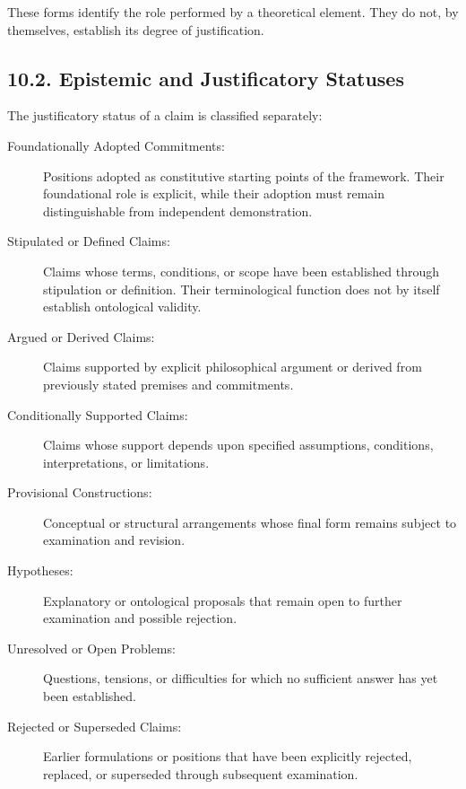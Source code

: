 These forms identify the role performed
by a theoretical element. They do not,
by themselves, establish its degree
of justification.

\subsection*{10.2. Epistemic and Justificatory Statuses}

The justificatory status of a claim
is classified separately:

\begin{description}

    \item[Foundationally Adopted Commitments:]
    Positions adopted as constitutive
    starting points of the framework.
    Their foundational role is explicit,
    while their adoption must remain
    distinguishable from independent
    demonstration.

    \item[Stipulated or Defined Claims:]
    Claims whose terms, conditions,
    or scope have been established
    through stipulation or definition.
    Their terminological function does
    not by itself establish ontological
    validity.

    \item[Argued or Derived Claims:]
    Claims supported by explicit
    philosophical argument or derived
    from previously stated premises
    and commitments.

    \item[Conditionally Supported Claims:]
    Claims whose support depends upon
    specified assumptions, conditions,
    interpretations, or limitations.

    \item[Provisional Constructions:]
    Conceptual or structural arrangements
    whose final form remains subject
    to examination and revision.

    \item[Hypotheses:]
    Explanatory or ontological proposals
    that remain open to further
    examination and possible rejection.

    \item[Unresolved or Open Problems:]
    Questions, tensions, or difficulties
    for which no sufficient answer
    has yet been established.

    \item[Rejected or Superseded Claims:]
    Earlier formulations or positions
    that have been explicitly rejected,
    replaced, or superseded through
    subsequent examination.

\end{description}

